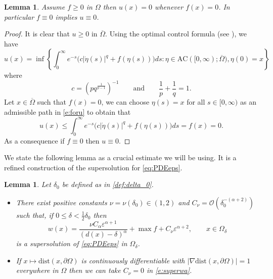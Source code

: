 \documentclass[11pt,reqno]{amsart}
\numberwithin{figure}{section}
\theoremstyle{plain}
\newtheorem{lem}[thm]{Lemma}
\theoremstyle{remark}
\numberwithin{equation}{section}
\begin{document}

\begin{lem}\label{lem:f=0} Assume $f\geq 0$ in $\Omega$ then $u(x) = 0$ whenever $f(x) = 0$. In particular $f \equiv 0$ implies $u \equiv 0$.
\end{lem}
\begin{proof} It is clear that $u\geq 0$ in $\overline{\Omega}$. Using the optimal control formula (see \cite{Bardi1997,Hung2019}), we have
\begin{equation}\label{e:foru}
    u(x) = \inf \left\lbrace \int_0^\infty e^{-  s}\Big(c|\dot{\eta}(s)|^{q} +f(\eta(s))\Big)ds: \eta\in \mathrm{AC}([0,\infty);\overline{\Omega}), \eta(0) = x\right\rbrace
\end{equation}
where 
\begin{equation*}
    c = \left(pq^{\frac{1}{p-1}}\right)^{-1} \qquad\text{and}\qquad \frac{1}{p} + \frac{1}{q} = 1.
\end{equation*}
Let $x\in \overline{\Omega}$ such that $f(x) = 0$, we can choose $\eta(s) = x$ for all $s\in [0,\infty)$ as an admissible path in \eqref{e:foru} to obtain that
\begin{equation*}
    u(x) \leq  \int_0^\infty e^{-  s}\Big(c|\dot{\eta}(s)|^{q} +f(\eta(s))\Big)ds = f(x) =  0.
\end{equation*}
As a consequence if $f\equiv 0$ then $u\equiv 0$.
\end{proof}
\noindent We state the following lemma as a crucial estimate we will be using. It is a refined construction of the supersolution for \eqref{eq:PDEeps}.
\begin{lem}\label{lem:super_refined} Let $\delta_0$ be defined as in \eqref{def:delta_0}. 
\begin{itemize}
    \item[(i)] There exist positive constants $\nu = \nu(\delta_0) \in (1,2)$ and $C_\nu =\mathcal{O}\left(\delta_0^{-(\alpha+2)}\right)$ such that, if $0\leq \delta <\frac{1}{2}\delta_0$ then
\begin{equation}\label{e:superwa}
    w(x) = \frac{\nu C_\alpha \varepsilon^{\alpha+1}}{(d(x)-\delta)^\alpha} + \max f + C_\nu \varepsilon^{\alpha+2}, \qquad x\in \Omega_\delta 
\end{equation}
is a supersolution of \eqref{eq:PDEeps} in $\Omega_\delta$. 
\item[(ii)] If $x\mapsto \mathrm{dist}(x,\partial\Omega)$ is continuously differentiable with $|\nabla \mathrm{dist}(x,\partial\Omega)| = 1$ everywhere in $\Omega$ then we can take $C_\nu = 0$ in \eqref{e:superwa}.
\end{itemize}
\end{lem}
\end{document}
